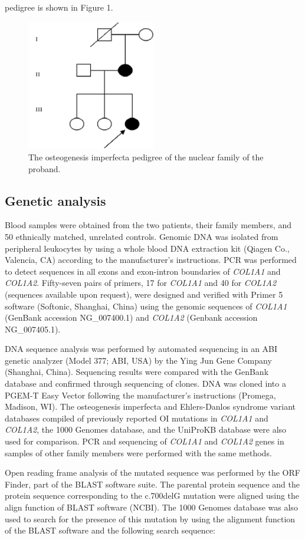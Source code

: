 pedigree is shown in Figure 1. \begin{figure}[!h] \centering \includegraphics[width=0.5\textwidth]{1415-4757-gmb-38-1-1-gf01.png} \caption{The osteogenesis imperfecta pedigree of the nuclear family of the proband.} \label{Figure 1} \end{figure} \subsection*{Genetic analysis}\par Blood samples were obtained from the two patients, their family members, and 50 ethnically matched, unrelated controls. Genomic DNA was isolated from peripheral leukocytes by using a whole blood DNA extraction kit (Qiagen Co., Valencia, CA) according to the manufacturer’s instructions. PCR was performed to detect sequences in all exons and exon-intron boundaries of \textit{COL1A1} and \textit{COL1A2}. Fifty-seven pairs of primers, 17 for \textit{COL1A1} and 40 for \textit{COL1A2} (sequences available upon request), were designed and verified with Primer 5 software (Softonic, Shanghai, China) using the genomic sequences of \textit{COL1A1} (GenBank accession NG\_007400.1) and \textit{COL1A2} (Genbank accession NG\_007405.1).\par DNA sequence analysis was performed by automated sequencing in an ABI genetic analyzer (Model 377; ABI, USA) by the Ying Jun Gene Company (Shanghai, China). Sequencing results were compared with the GenBank database and confirmed through sequencing of clones. DNA was cloned into a PGEM-T Easy Vector following the manufacturer’s instructions (Promega, Madison, WI). The osteogenesis imperfecta and Ehlers-Danlos syndrome variant databases compiled of previously reported OI mutations in \textit{COL1A1} and \textit{COL1A2}, the 1000 Genomes database, and the UniProKB database were also used for comparison. PCR and sequencing of \textit{COL1A1} and \textit{COL1A2} genes in samples of other family members were performed with the same methods.\par Open reading frame analysis of the mutated sequence was performed by the ORF Finder, part of the BLAST software suite. The parental protein sequence and the protein sequence corresponding to the c.700delG mutation were aligned using the align function of BLAST software (NCBI). The 1000 Genomes database was also used to search for the presence of this mutation by using the alignment function of the BLAST software and the following search sequence: 